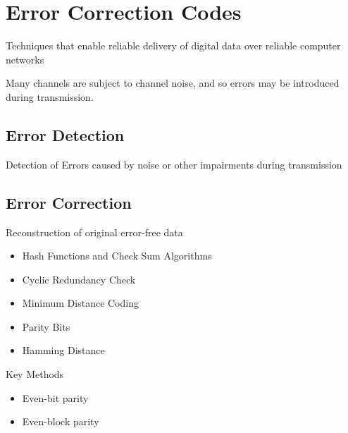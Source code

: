 
\section{Error Correction Codes}
Techniques that enable reliable delivery of digital data over reliable computer networks

Many channels are subject to channel noise, and so errors may be introduced during transmission.

\subsection{Error Detection}
Detection of Errors caused by noise or other impairments during transmission

\subsection{Error Correction}
Reconstruction of original error-free data


\begin{itemize}
\item Hash Functions and Check Sum Algorithms 
\item Cyclic Redundancy Check
\item Minimum Distance Coding
\item Parity Bits
\item Hamming Distance
\end{itemize}

Key Methods
\begin{itemize}
\item Even-bit parity
\item Even-block parity
\end{itemize}
